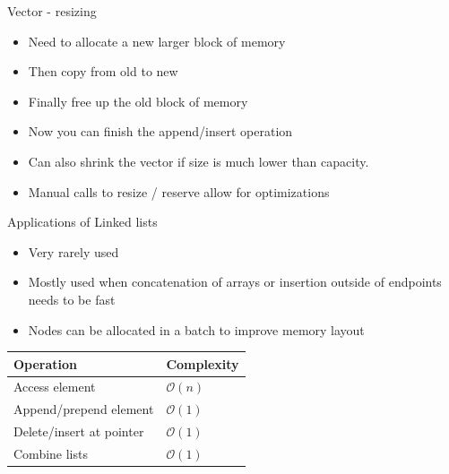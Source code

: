 \documentclass{beamer}
\begin{document}
\begin{frame}[plain]{Vector - resizing}
    \begin{itemize}
        \item Need to allocate a new larger block of memory
        \item Then copy from old to new
        \item Finally free up the old block of memory
        \item Now you can finish the append/insert operation
        \item Can also shrink the vector if size is much lower than capacity.
        \item Manual calls to resize / reserve allow for optimizations
    \end{itemize}
\end{frame}

\begin{frame}[plain]{Applications of Linked lists}
    \begin{itemize}
        \item Very rarely used
        \item Mostly used when concatenation of arrays or insertion outside of endpoints needs to be fast
        \item Nodes can be allocated in a batch to improve memory layout
    \end{itemize}
    \vspace*{1cm}
    \begin{center}
    \begin{tabular}{l|l}
    Operation & Complexity \\ \hline
    Access element & $\mathcal{O}(n)$ \\
    Append/prepend element & $\mathcal{O}(1)$ \\
    Delete/insert at pointer & $\mathcal{O}(1)$ \\
    Combine lists & $\mathcal{O}(1)$ \\
    \end{tabular}
    \end{center}
\end{frame}
\end{document}
